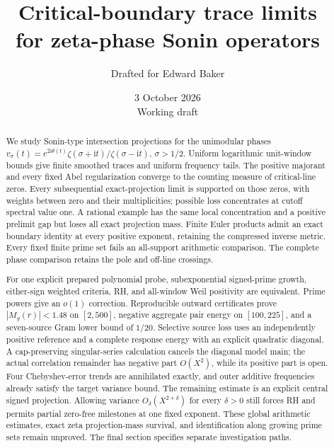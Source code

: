\documentclass[11pt]{article}
\title{Critical-boundary trace limits\\for zeta-phase Sonin operators}
\author{Drafted for Edward Baker}
\date{3 October 2026\\[3pt]\small Working draft}
\numberwithin{equation}{section}
\theoremstyle{definition}
\theoremstyle{remark}
\newcommand{\ii}{\mathrm i}
\begin{document}
\maketitle

\begin{abstract}
We study Sonin-type intersection projections for the unimodular phases
\(v_\sigma(t)=e^{2\ii\theta(t)}
\zeta(\sigma+\ii t)/\zeta(\sigma-\ii t)\), \(\sigma>1/2\).
Uniform logarithmic unit-window bounds give finite smoothed traces and
uniform frequency tails. The positive majorant and every fixed Abel
regularization converge to the counting measure of critical-line zeros.
Every subsequential exact-projection limit is supported on those zeros,
with weights between zero and their multiplicities; possible loss
concentrates at cutoff spectral value one. A rational example has the
same local concentration and a positive prelimit gap but loses all exact
projection mass. Finite Euler products admit an exact boundary identity
at every positive exponent, retaining the compressed inverse metric.
Every fixed finite prime set fails an all-support arithmetic comparison.
The complete phase comparison retains the pole and off-line crossings.

For one explicit prepared polynomial probe, subexponential signed-prime
growth, either-sign weighted criteria, RH, and all-window Weil positivity
are equivalent. Prime powers give an \(o(1)\) correction. Reproducible
outward certificates prove \(|M_g(r)|<1.48\) on \([2,500]\), negative
aggregate pair energy on \([100,225]\), and a seven-source Gram lower
bound of \(1/20\). Selective source loss uses an independently positive
reference and a complete response energy with an explicit quadratic
diagonal. A cap-preserving singular-series calculation cancels the
diagonal model main; the actual correlation remainder has negative part
\(O(X^2)\), while its positive part is open. Four Chebyshev-error trends
are annihilated exactly, and outer additive frequencies already satisfy
the target variance bound. The remaining estimate is an explicit central
signed projection. Allowing variance \(O_\delta(X^{2+\delta})\) for every
\(\delta>0\) still forces RH and permits partial zero-free milestones at
one fixed exponent. These global arithmetic estimates, exact zeta
projection-mass survival, and identification along growing prime sets
remain unproved. The final section specifies separate investigation paths.
\end{abstract}
\end{document}
